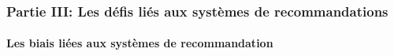 \begin{frame}

    \frametitle{Partie III: Les défis liés aux systèmes de recommandations}
    \framesubtitle{Les biais liées aux systèmes de recommandation}

    \begin{figure}
        \centering
    \end{figure}

\end{frame}

